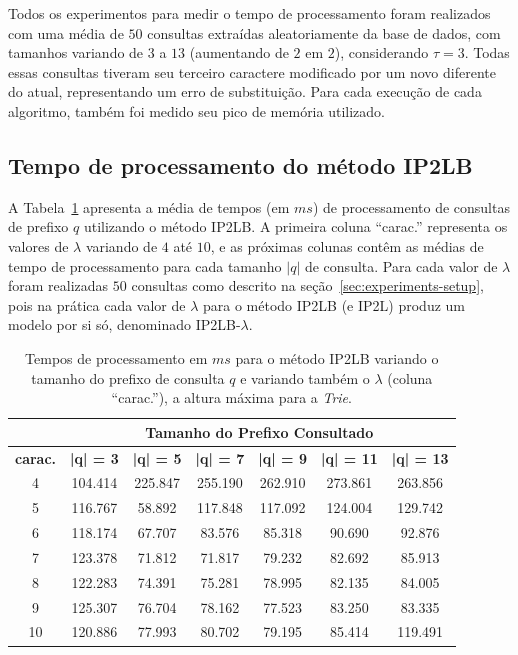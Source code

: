 Todos os experimentos para medir o tempo de processamento foram realizados com uma média de $50$ consultas extraídas aleatoriamente da base de dados, com tamanhos variando de $3$ a $13$ (aumentando de $2$ em $2$), considerando $\tau=3$. Todas essas consultas tiveram seu terceiro caractere modificado por um novo diferente do atual, representando um erro de substituição. Para cada execução de cada algoritmo, também foi medido seu pico de memória utilizado.

\subsection{Tempo de processamento do método IP2LB}

A Tabela~\ref{tab:metodo-performance} apresenta a média de tempos (em $ms$) de processamento de consultas de prefixo $q$ utilizando o método IP2LB. A primeira coluna ``carac.'' representa os valores de $\lambda$ variando de $4$ até $10$, e as próximas colunas contêm as médias de tempo de processamento para cada tamanho $|q|$ de consulta. Para cada valor de $\lambda$ foram realizadas $50$ consultas como descrito na seção~\ref{sec:experiments-setup}, pois na prática cada valor de $\lambda$ para o método IP2LB (e IP2L) produz um modelo por si só, denominado IP2LB-$\lambda$.

\begin{table}[h]
\centering
\begin{tabular}{c|c|c|c|c|c|c|}
\cline{2-7}
 & \multicolumn{6}{c|}{\textbf{Tamanho do Prefixo Consultado}} \\ \hline
\multicolumn{1}{|c|}{\textbf{carac.}} & \textbf{|q| = 3} & \textbf{|q| = 5} & \textbf{|q| = 7} & \textbf{|q| = 9} & \textbf{|q| = 11} & \textbf{|q| = 13} \\ \hline
\multicolumn{1}{|c|}{4} & 104.414 & 225.847 & 255.190 & 262.910 & 273.861 & 263.856 \\ \hline
\multicolumn{1}{|c|}{5} & 116.767 & 58.892 & 117.848 & 117.092 & 124.004 & 129.742 \\ \hline
\multicolumn{1}{|c|}{6} & 118.174 & 67.707 & 83.576 & 85.318 & 90.690 & 92.876 \\ \hline
\multicolumn{1}{|c|}{7} & 123.378 & 71.812 & 71.817 & 79.232 & 82.692 & 85.913 \\ \hline
\multicolumn{1}{|c|}{8} & 122.283 & 74.391 & 75.281 & 78.995 & 82.135 & 84.005 \\ \hline
\multicolumn{1}{|c|}{9} & 125.307 & 76.704 & 78.162 & 77.523 & 83.250 & 83.335 \\ \hline
\multicolumn{1}{|c|}{10} & 120.886 & 77.993 & 80.702 & 79.195 & 85.414 & 119.491 \\ \hline
\end{tabular}
\caption{Tempos de processamento em $ms$ para o método IP2LB variando o tamanho do prefixo de consulta $q$ e variando também o $\lambda$ (coluna ``carac.''), a altura máxima para a \textit{Trie}.}
\label{tab:metodo-performance}
\end{table}

